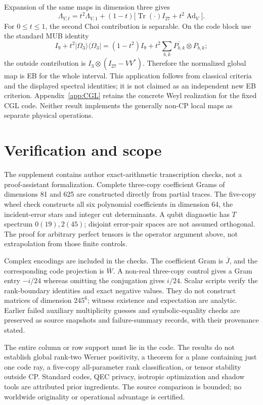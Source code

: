 \documentclass[11pt,a4paper]{article}
\newcommand{\Tr}{\operatorname{Tr}}
\begin{document}
Expansion of the same maps in dimension three gives
\[
 \Lambda_{V,t}=t^2\Lambda_{V,1}
 +(1-t)\bigl[\Tr(\cdot)I_{27}+t^2\operatorname{Ad}_V\bigr].
\]
For \(0\le t\le1\), the second Choi contribution is separable. On the code block use the standard MUB identity \cite{MUB}
\[
 I_9+t^2|\Omega_3\rangle\langle\Omega_3|
 =(1-t^2)I_9+t^2\sum_{b,k}\overline{P_{b,k}}\otimes P_{b,k};
\]
the outside contribution is \(I_3\otimes(I_{27}-VV^*)\). Therefore the normalized global map is EB for the whole interval. This application follows from classical criteria and the displayed spectral identities; it is not claimed as an independent new EB criterion. Appendix~\ref{app:CGL} retains the concrete Weyl realization for the fixed CGL code. Neither result implements the generally non-CP local maps as separate physical operations.

\section{Verification and scope}
The supplement contains author exact-arithmetic transcription checks, not a proof-assistant formalization. Complete three-copy coefficient Grams of dimensions 81 and 625 are constructed directly from partial traces. The five-copy wheel check constructs all six polynomial coefficients in dimension 64, the incident-error stars and integer cut determinants. A qubit diagnostic has \(T\) spectrum \(0(19),2(45)\); disjoint error-pair spaces are not assumed orthogonal. The proof for arbitrary perfect tensors is the operator argument above, not extrapolation from those finite controls.

Complex encodings are included in the checks. The coefficient Gram is \(\overline J\), and the corresponding code projection is \(\overline W\). A non-real three-copy control gives a Gram entry \(-i/24\) whereas omitting the conjugation gives \(i/24\). Scalar scripts verify the rank-boundary identities and exact negative values. They do not construct matrices of dimension \(245^6\); witness existence and expectation are analytic. Earlier failed auxiliary multiplicity guesses and symbolic-equality checks are preserved as source snapshots and failure-summary records, with their provenance stated.

The entire column or row support must lie in the code. The results do not establish global rank-two Werner positivity, a theorem for a plane containing just one code ray, a five-copy all-parameter rank classification, or tensor stability outside CP. Standard codes, QEC privacy, isotropic optimization and shadow tools are attributed prior ingredients. The source comparison is bounded; no worldwide originality or operational advantage is certified.
\end{document}
